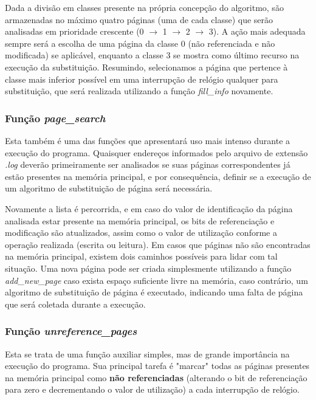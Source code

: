 \documentclass[a4paper, 12pt]{article}
\begin{document}
Dada a divisão em classes presente na própria concepção do algoritmo, são armazenadas no máximo quatro páginas (uma de cada classe) que serão analisadas em prioridade crescente (0 \(\rightarrow\) 1 \(\rightarrow\) 2 \(\rightarrow\) 3). A ação mais adequada sempre será a escolha de uma página da classe 0 (não referenciada e não modificada) se aplicável, enquanto a classe 3 se mostra como último recurso na execução da substituição. Resumindo, selecionamos a página que pertence à classe mais inferior possível em uma interrupção de relógio qualquer para substituição, que será realizada utilizando a função \emph{fill\_info} novamente. 

\subsubsection{Função \emph{page\_search}}

Esta também é uma das funções que apresentará uso mais intenso durante a execução do programa. Quaisquer endereços informados pelo arquivo de extensão \emph{.log} deverão primeiramente ser analisados se suas páginas correspondentes já estão presentes na memória principal, e por consequência, definir se a execução de um algoritmo de substituição de página será necessária. 

Novamente a lista é percorrida, e em caso do valor de identificação da página analisada estar presente na memória principal, os bits de referenciação e modificação são atualizados, assim como o valor de utilização conforme a operação realizada (escrita ou leitura). Em casos que páginas não são encontradas na memória principal, existem dois caminhos possíveis para lidar com tal situação. Uma nova página pode ser criada simplesmente utilizando a função \emph{add\_new\_page} caso exista espaço suficiente livre na memória, caso contrário, um algoritmo de substituição de página é executado, indicando uma falta de página que será coletada durante a execução.

\subsubsection{Função \emph{unreference\_pages}}

Esta se trata de uma função auxiliar simples, mas de grande importância na execução do programa. Sua principal tarefa é "marcar" todas as páginas presentes na memória principal como \textbf{não referenciadas} (alterando o bit de referenciação para zero e decrementando o valor de utilização) a cada interrupção de relógio.
\end{document}
